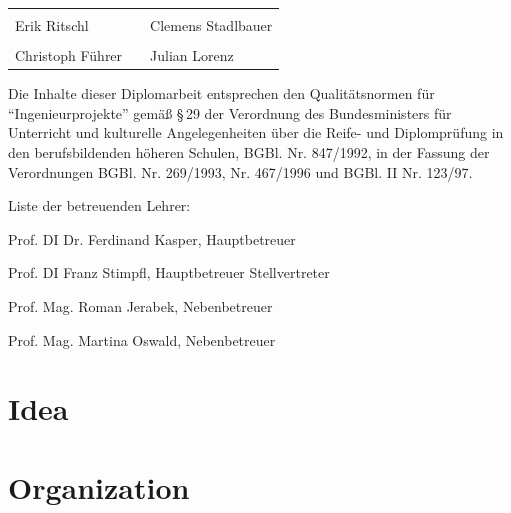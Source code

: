 \documentclass[12pt,a4paper,naustrian,english,oneside,openright,DIV=12,BCOR=1cm]{scrbook}
\begin{document}
\vfill
\noindent\begin{tabular}{p{.45\linewidth}p{.1\linewidth}p{.45\linewidth}}
	\dotfill & & \dotfill \\
	Erik Ritschl & & Clemens Stadlbauer \\[16ex]
	\dotfill & & \dotfill \\
	Christoph Führer & & Julian Lorenz
\end{tabular}
\vfill



\thispagestyle{fancy}

Die Inhalte dieser Diplomarbeit entsprechen den Qualitätsnormen für
``Ingenieurprojekte'' gemäß §\,29 der Verordnung des Bundesministers
für Unterricht und kulturelle Angelegenheiten über die Reife- und
Diplomprüfung in den berufsbildenden höheren Schulen, BGBl. Nr. 847/1992,
in der Fassung der Verordnungen BGBl. Nr. 269/1993, Nr. 467/1996 und
BGBl. II Nr. 123/97.

\vspace{10mm}


Liste der betreuenden Lehrer:

Prof. DI Dr. Ferdinand Kasper, Hauptbetreuer

Prof. DI Franz Stimpfl, Hauptbetreuer Stellvertreter

Prof. Mag. Roman Jerabek, Nebenbetreuer

Prof. Mag. Martina Oswald, Nebenbetreuer %

\vspace{10mm}

\renewcommand*{\chapterpagestyle}{fancy}
\cleardoublepage{}
\tableofcontents{}
\cleardoublepage{}
\listoftables
\cleardoublepage{}
\listoffigures
\cleardoublepage{}
\listoflistings

\cleardoublepage{}

\pagestyle{fancy}
\thispagestyle{fancy}

\newcommand{\tfpath}[1]{\textbf{#1}}
\newcommand{\tfcode}[1]{\texttt{\detokenize{#1}}}

\chapter{Idea}


\chapter{Organization}

\end{document}

